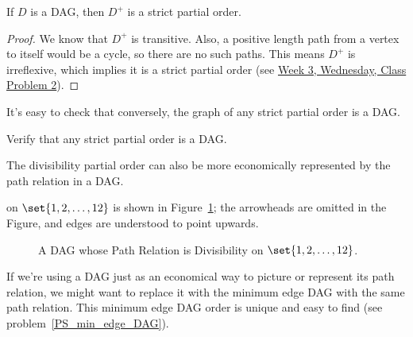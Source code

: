 \begin{lemma}
If $D$ is a DAG, then $D^+$ is a strict partial order.
\end{lemma}

\begin{proof}
We know that $D^+$ is transitive.  Also, a positive length path from a
vertex to itself would be a cycle, so there are no such paths.  This means
$D^+$ is irreflexive, which implies it is a strict partial order (see
\href{http://courses.csail.mit.edu/6.042/spring09/cp3r.pdf}{Week 3,
Wednesday, Class Problem 2}).
\end{proof}

It's easy to check that conversely, the graph of any strict partial order
is a DAG.

\begin{notesproblem}
Verify that any strict partial order is a DAG.

\end{notesproblem}
\fi

The divisibility partial order can also be more economically represented by
the path relation in a DAG.   on $\set{1,2,\dots,12}$ is shown in
Figure~\ref{fig:divisibility-DAG}; the arrowheads are omitted in the
Figure, and edges are understood to point upwards.

\begin{figure}[h]
\begin{center}

\end{center}
\caption{A DAG whose Path Relation is Divisibility on $\set{1,2,\dots,12}$.}
\label{fig:divisibility-DAG}
\end{figure}


If we're using a DAG just as an economical way to picture or represent its
path relation, we might want to replace it with the minimum edge DAG with
the same path relation.  This minimum edge DAG order is unique and easy to
find (see problem~\ref{PS_min_edge_DAG}).

\begin{problems}
\homeworkproblems
\end{problems}


\endinput
